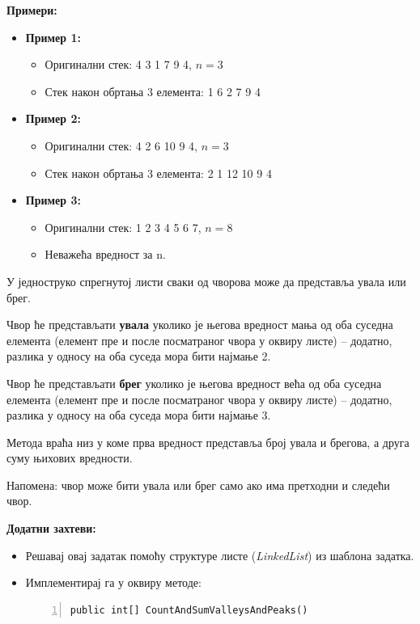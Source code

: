 \textbf{Примери:}
\begin{itemize}
    \item \textbf{Пример 1:}
    \begin{itemize}
        \item Оригинални стек: 4 3 1 7 9 4, $n = 3$
        \item Стек након обртања 3 елемента: 1 6 2 7 9 4
    \end{itemize}
    \item \textbf{Пример 2:}
    \begin{itemize}
        \item Оригинални стек: 4 2 6 10 9 4, $n = 3$
        \item Стек након обртања 3 елемента: 2 1 12 10 9 4
    \end{itemize}
    \item \textbf{Пример 3:}
    \begin{itemize}
        \item Оригинални стек: 1 2 3 4 5 6 7, $n = 8$
        \item Неважећа вредност за n.
    \end{itemize}
\end{itemize}



У једноструко спрегнутој листи сваки од чворова може да представља увала или брег.

Чвор ће представљати \textbf{увала} уколико је његова вредност мања од оба суседна елемента (елемент пре и после посматраног чвора у оквиру листе) -- додатно, разлика у односу на оба суседа мора бити најмање 2.

Чвор ће представљати \textbf{брег} уколико је његова вредност већа од оба суседна елемента (елемент пре и после посматраног чвора у оквиру листе) -- додатно, разлика у односу на оба суседа мора бити најмање 3.

Метода враћа низ у коме прва вредност представља број увала и брегова, а друга суму њихових вредности.

Напомена: чвор може бити увала или брег само ако има претходни и следећи чвор.

\textbf{Додатни захтеви:}
\begin{itemize}
    \item Решавај овај задатак помоћу структуре листе (\textit{LinkedList}) из шаблона задатка.
    \item Имплементирај га у оквиру методе:
    \begin{Verbatim}[fontsize=\footnotesize, numbers=left, xleftmargin=10mm]
public int[] CountAndSumValleysAndPeaks()
    \end{Verbatim}
\end{itemize}

